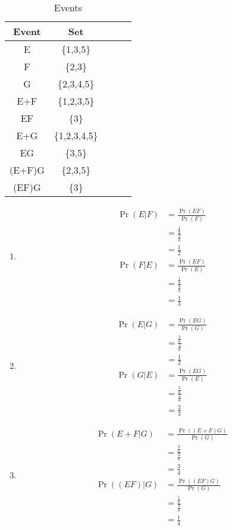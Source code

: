 \documentclass[journal,12pt,twocolumn]{IEEEtran}
\providecommand{\pr}[1]{\ensuremath{\Pr\left(#1\right)}}
\begin{document}
	\begin{table}[ht!]
	    \centering
	    \begin{tabular}{|c|c|c|c|c|}
	    \hline
	    Event & Set\\
	    \hline\hline
	    E & \{1,3,5\}   \\
	    F &  \{2,3\}    \\
	    G & \{2,3,4,5\} \\
	    E+F & \{1,2,3,5\} \\
	    EF & \{3\} \\
	    E+G & \{1,2,3,4,5\} \\
	    EG & \{3,5\} \\
	   (E+F)G & \{2,3,5\} \\
	   (EF)G & \{3\} \\
	    \hline
	    \end{tabular}
	    \caption{Events}
	    \label{tab:Table1}
	\end{table}
 \begin{enumerate}[label=(\roman*)]
     \item 
     \begin{align}
         \pr{E|F}&=\frac{\pr{EF}}{\pr{F}}\\
                 &=\frac{\frac{1}{6}}{\frac{2}{6}}\\
                 &=\frac{1}{2}\\
         \pr{F|E}&=\frac{\pr{EF}}{\pr{E}}\\
                 &=\frac{\frac{1}{6}}{\frac{3}{6}}\\
                 &=\frac{1}{3}
    \end{align}
    \item
    \begin{align}
    \pr{E|G}&=\frac{\pr{EG}}{\pr{G}}\\
                 &=\frac{\frac{2}{6}}{\frac{4}{6}}\\
                 &=\frac{1}{2}\\
    \pr{G|E}&=\frac{\pr{EG}}{\pr{E}}\\
                 &=\frac{\frac{2}{6}}{\frac{3}{6}}\\
                 &=\frac{2}{3}
    \end{align}
    \item
    \begin{align}
    \pr{E+F|G}&=\frac{\pr{(E+F)G}}{\pr{G}}\\
              &=\frac{\frac{3}{6}}{\frac{4}{6}}\\
              &=\frac{3}{4}\\
    \pr{(EF)|G}&=\frac{\pr{(EF)G}}{\pr{G}}\\
               &=\frac{\frac{1}{6}}{\frac{4}{6}}\\
               &=\frac{1}{4}
    \end{align}
 \end{enumerate}


	
	
	
\end{document}
